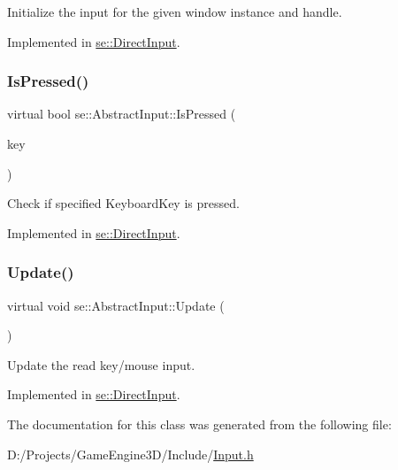 Initialize the input for the given window instance and handle. 

Implemented in \mbox{\hyperlink{classse_1_1_direct_input_ae8f8c4306ad58f7696548d2c63f01e6f}{se\+::\+Direct\+Input}}.

\mbox{\label{classse_1_1_abstract_input_a4375b92281cee63064c898a791ddd1a3}} 
\subsubsection{\texorpdfstring{Is\+Pressed()}{IsPressed()}}
{\footnotesize\ttfamily virtual bool se\+::\+Abstract\+Input\+::\+Is\+Pressed (\begin{DoxyParamCaption}\item[{\mbox{\hyperlink{namespacese_a94221cf8f238f1eadbe3ac4b8ac7bc71}{Keyboard\+Key}}}]{key }\end{DoxyParamCaption})\hspace{0.3cm}{\ttfamily [pure virtual]}}

Check if specified Keyboard\+Key is pressed. 

Implemented in \mbox{\hyperlink{classse_1_1_direct_input_ad9669e6834c3fcac489050a82beb71f7}{se\+::\+Direct\+Input}}.

\mbox{\label{classse_1_1_abstract_input_a7c9b63e9df453d38c035fb9fa91c0d70}} 
\subsubsection{\texorpdfstring{Update()}{Update()}}
{\footnotesize\ttfamily virtual void se\+::\+Abstract\+Input\+::\+Update (\begin{DoxyParamCaption}{ }\end{DoxyParamCaption})\hspace{0.3cm}{\ttfamily [pure virtual]}}

Update the read key/mouse input. 

Implemented in \mbox{\hyperlink{classse_1_1_direct_input_a863123d7304364a55fd2135f27195500}{se\+::\+Direct\+Input}}.



The documentation for this class was generated from the following file\+:\begin{DoxyCompactItemize}
\item 
D\+:/\+Projects/\+Game\+Engine3\+D/\+Include/\mbox{\hyperlink{_input_8h}{Input.\+h}}\end{DoxyCompactItemize}
